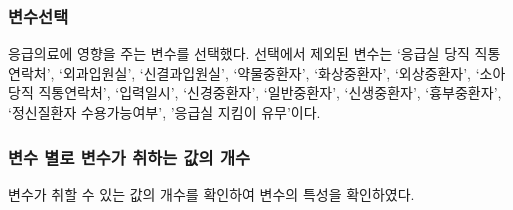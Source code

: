 \documentclass[
]{article}
\newenvironment{Shaded}{\begin{snugshade}}{\end{snugshade}}
\newcommand{\CommentTok}[1]{\textcolor[rgb]{0.56,0.35,0.01}{\textit{#1}}}
\newcommand{\ControlFlowTok}[1]{\textcolor[rgb]{0.13,0.29,0.53}{\textbf{#1}}}
\newcommand{\DecValTok}[1]{\textcolor[rgb]{0.00,0.00,0.81}{#1}}
\newcommand{\KeywordTok}[1]{\textcolor[rgb]{0.13,0.29,0.53}{\textbf{#1}}}
\newcommand{\NormalTok}[1]{#1}
\newcommand{\OperatorTok}[1]{\textcolor[rgb]{0.81,0.36,0.00}{\textbf{#1}}}
\newcommand{\StringTok}[1]{\textcolor[rgb]{0.31,0.60,0.02}{#1}}
\begin{document}
\hypertarget{uxbcc0uxc218uxc120uxd0dd}{%
\subsubsection{변수선택}\label{uxbcc0uxc218uxc120uxd0dd}}

응급의료에 영향을 주는 변수를 선택했다. 선택에서 제외된 변수는 `응급실
당직 직통연락처', `외과입원실', `신결과입원실', `약물중환자',
`화상중환자', `외상중환자', `소아당직 직통연락처', `입력일시',
`신경중환자', `일반중환자', `신생중환자', `흉부중환자', `정신질환자
수용가능여부', '응급실 지킴이 유무'이다.

\begin{Shaded}
\end{Shaded}

\hypertarget{uxbcc0uxc218-uxbcc4uxb85c-uxbcc0uxc218uxac00-uxcde8uxd558uxb294-uxac12uxc758-uxac1cuxc218}{%
\subsubsection{변수 별로 변수가 취하는 값의
개수}\label{uxbcc0uxc218-uxbcc4uxb85c-uxbcc0uxc218uxac00-uxcde8uxd558uxb294-uxac12uxc758-uxac1cuxc218}}

변수가 취할 수 있는 값의 개수를 확인하여 변수의 특성을 확인하였다.

\begin{Shaded}
\end{Shaded}
\end{document}
